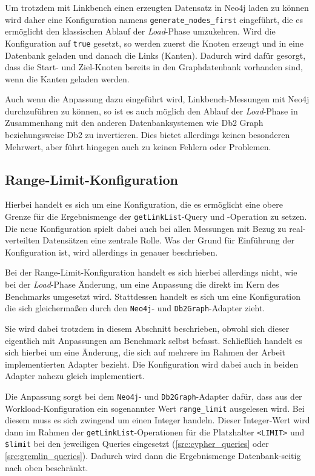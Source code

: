 Um trotzdem mit Linkbench einen erzeugten Datensatz in Neo4j laden zu können wird daher eine Konfiguration namens \texttt{generate\_nodes\_first} eingeführt, die es ermöglicht den klassischen Ablauf der \textit{Load}-Phase umzukehren. Wird die Konfiguration auf \texttt{true} gesetzt, so werden zuerst die Knoten erzeugt und in eine Datenbank geladen und danach die Links (Kanten). Dadurch wird dafür gesorgt, dass die Start- und Ziel-Knoten bereits in den Graphdatenbank vorhanden sind, wenn die Kanten geladen werden. 

Auch wenn die Anpassung dazu eingeführt wird, Linkbench-Messungen mit Neo4j durchzuführen zu können, so ist es auch möglich den Ablauf der \textit{Load}-Phase in Zusammenhang mit den anderen Datenbanksystemen wie Db2 Graph beziehungsweise Db2 zu invertieren. Dies bietet allerdings keinen besonderen Mehrwert, aber führt hingegen auch zu keinen Fehlern oder Problemen.  

\subsection{Range-Limit-Konfiguration}
\label{implementierung:anpassung:limit}
Hierbei handelt es sich um eine Konfiguration, die es ermöglicht eine obere Grenze für die Ergebnismenge der \texttt{getLinkList}-Query und -Operation zu setzen. Die neue Konfiguration spielt dabei auch bei allen Messungen mit Bezug zu real-verteilten Datensätzen eine zentrale Rolle. Was der Grund für Einführung der Konfiguration ist, wird allerdings in  genauer beschrieben. 

Bei der Range-Limit-Konfiguration handelt es sich hierbei allerdings nicht, wie bei der \textit{Load}-Phase Änderung, um eine Anpassung die direkt im Kern des Benchmarks umgesetzt wird. Stattdessen handelt es sich um eine Konfiguration die sich gleichermaßen durch den \texttt{Neo4j}- und \texttt{Db2Graph}-Adapter zieht. 

Sie wird dabei trotzdem in diesem Abschnitt beschrieben, obwohl sich dieser eigentlich mit Anpassungen am Benchmark selbst befasst. Schließlich handelt es sich hierbei um eine Änderung, die sich auf mehrere im Rahmen der Arbeit implementierten Adapter bezieht. Die Konfiguration wird dabei auch in beiden Adapter nahezu gleich implementiert. 

Die Anpassung sorgt bei dem \texttt{Neo4j}- und \texttt{Db2Graph}-Adapter dafür, dass aus der Workload-Konfiguration ein sogenannter Wert \texttt{range\_limit} ausgelesen wird. Bei diesem muss es sich zwingend um einen Integer handeln. Dieser Integer-Wert wird dann im Rahmen der \texttt{getLinkList}-Operationen für die Platzhalter \texttt{<LIMIT>} und \texttt{\$limit} bei den jeweiligen Queries eingesetzt (\autoref{src:cypher_queries} oder \autoref{src:gremlin_queries}). Dadurch wird dann die Ergebnismenge Datenbank-seitig nach oben beschränkt. 

